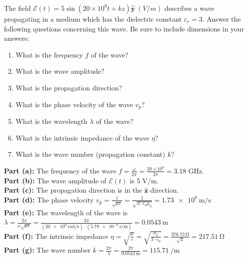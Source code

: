 \documentclass[11pt]{article}
\newcommand{\bh}[1]{\mathbf{\hat{#1}}}
\begin{document}
\makeAssignmentTitle

\begin{homeworkProblem}
    The field $\bm{\mathcal{E}}(t) = 5\sin(20 \times 10^9 t + kz) \mathbf{\hat{y}} ~ (\unit{V/m})$
    describes a wave propagating in a medium which has the dielectric constant
    $\varepsilon_r = 3$. Answer the following questions concerning this wave. Be sure to
    include dimensions in your answers:

    \begin{enumerate}[label=(\alph*), topsep=5pt]
        \item What is the frequency $f$ of the wave?
        \item What is the wave amplitude?
        \item What is the propagation direction?
        \item What is the phase velocity of the wave $v_p$?
        \item What is the wavelength $\lambda$ of the wave?
        \item What is the intrinsic impedance of the wave $\eta$?
        \item What is the wave number (propagation constant) $k$?
    \end{enumerate} \vspace{1\baselineskip}

    \solution

    \textbf{Part (a):} The frequency of the wave $f = \frac{\omega}{2\pi} = \frac{20 \times 10^9}{2\pi} = 3.18$ GHz. \\

    \textbf{Part (b):} The wave amplitude of $\bm{\mathcal{E}}(t)$ is 5 V/m. \\

    \textbf{Part (c):} The propagation direction is in the $\bh{z}$ direction.\\

    \textbf{Part (d):} The phase velocity $v_p = \frac{1}{\sqrt{\mu\varepsilon}} = \frac{1}{\sqrt{3 \cdot \varepsilon_0 \mu_0}} = \qty{1.73e8}{\meter/\second}$ \\

    \textbf{Part (e):} The wavelength of the wave is $\lambda = \frac{2\pi}{\omega \sqrt{\mu\varepsilon}} = \frac{2\pi}{(\qty{20e9}{\radian/\second}) \cdot (\qty{5.78e-9}{\second/\meter})} = \qty{0.0543}{\meter}$ \\

    \textbf{Part (f):} The intrinsic impedance $\eta = \sqrt{\frac{\mu}{\varepsilon}} = \sqrt{\frac{\mu_0}{3\cdot\varepsilon_0}} = \frac{\qty{376.73}{\ohm}}{\sqrt{3}} = \qty{217.51}{\ohm}$ \\

    \textbf{Part (g):} The wave number $k = \frac{2\pi}{\lambda} = \frac{2\pi}{\qty{0.0543}{\meter}} = \qty{115.71}{\per\meter}$ \\

\end{homeworkProblem}
\end{document}
